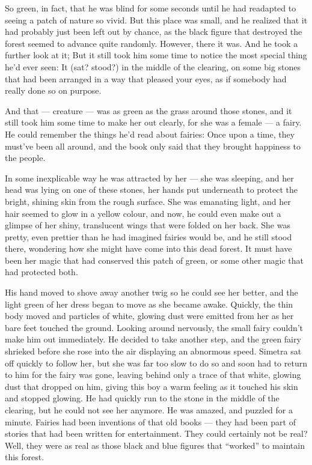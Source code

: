 So green, in fact, that he was blind for some seconds until he had readapted to seeing a patch of nature so vivid. But this place was small, and he realized that it had probably just been left out by chance, as the black figure that destroyed the forest seemed to advance quite randomly. However, there it was. 
And he took a further look at it; But it still took him some time to notice the most special thing he'd ever seen: It (sat? stood?) in the middle of the clearing, on some big stones that had been arranged in a way that pleased your eyes, as if somebody had really done so on purpose.

And that --- creature --- was as green as the grass around those stones, and it still took him some time to make her out clearly, for she was a female --- a fairy. He could remember the things he'd read about fairies: Once upon a time, they must've been all around, and the book only said that they brought happiness to the people.

In some inexplicable way he was attracted by her --- she was sleeping, and her head was lying on one of these stones, her hands put underneath to protect the bright, shining skin from the rough surface. She was emanating light, and her hair seemed to glow in a yellow colour, and now, he could even make out a glimpse of her shiny, translucent wings that were folded on her back.
She was pretty, even prettier than he had imagined fairies would be, and he still stood there, wondering how she might have come into this dead forest. It must have been her magic that had conserved this patch of green, or some other magic that had protected both.

His hand moved to shove away another twig so he could see her better, and the light green of her dress began to move as she became awake. 
Quickly, the thin body moved and particles of white, glowing dust were emitted from her as her bare feet touched the ground. Looking around nervously, the small fairy couldn't make him out immediately. He decided to take another step, and the green fairy shrieked before she rose into the air displaying an abnormous speed. Simetra sat off quickly to follow her, but she was far too slow to do so and soon had to return to him for the fairy was gone, leaving behind only a trace of that white, glowing dust that dropped on him, giving this boy a warm feeling as it touched his skin and stopped glowing. He had quickly run to the stone in the middle of the clearing, but he could not see her anymore. 
He was amazed, and puzzled for a minute. Fairies had been inventions of that old books --- they had been part of stories that had been written for entertainment. They could certainly not be real? Well, they were as real as those black and blue figures that \enquote{worked} to maintain this forest.

